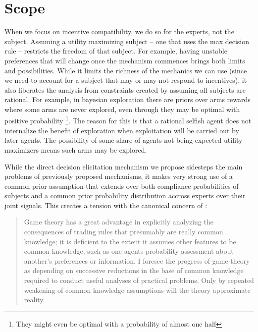 \section{Scope}

When we focus on incentive compatibility, we do so for the experts, not the subject.
Assuming a utility maximizing subject -- one that uses the max decision rule -- restricts the freedom of that subject.
For example, having unstable preferences that will change once the mechanism commences brings both limits and possibilities.
While it limits the richness of the mechanics we can use (since we need to account for a subject that may or may not respond to incentives), it also liberates the analysis from constraints created by assuming all subjects are rational.
For example, in bayesian  exploration \citep{mansour2015bayesian} there are priors over arms rewards where some arms are never explored, even through they may be optimal with positive probability \footnote{They might even be optimal with a probability of almost one half}. The reason for this is that a rational selfish agent does not internalize the benefit of exploration when exploitation will be carried out by later agents. The possibility of some share of agents not being expected utility maximizers means such arms may be explored. 


While the direct decision elicitation mechanism we propose sidesteps the main problems of previously proposed mechanisms, it makes very strong use of a common prior assumption that extends over both compliance probabilities of subjects and a common prior probability distribution accross experts over their joint signals. This creates a tension with the canonical concern of \citep{wilson1987}:


\begin{quote}
Game theory has a great advantage in explicitly analyzing the consequences of trading rules that presumably are really common knowledge; it is deficient to the extent it assumes other features to be common knowledge, such as one agents probability assessment about another's preferences or information. I foresee the progress of game theory as depending on successive reductions in the base of common knowledge required to conduct useful analyses of practical problems. Only by repeated weakening of common knowledge assumptions will the theory approximate reality.
\end{quote}


